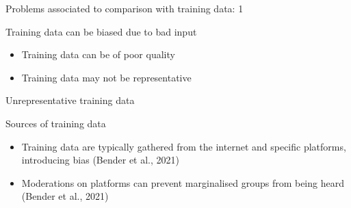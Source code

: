 \documentclass[compress]{beamer}
\begin{document}

\begin{frame}[fragile]{Problems associated to comparison with training data: 1} 	
	\begin{alertblock}{Training data can be biased due to bad input}
		\begin{itemize}
			\item Training data can be of poor quality
			\item Training data may not be representative
		\end{itemize}
	\end{alertblock}
\end{frame}

\begin{frame}[fragile]{Unrepresentative training data} 	
	\begin{alertblock}{Sources of training data}
		\begin{itemize}
			\item Training data are typically gathered from the internet and specific platforms, introducing bias (Bender et al., 2021)
			\item Moderations on platforms can prevent marginalised groups from being heard (Bender et al., 2021)
		\end{itemize}
	\end{alertblock}
\end{frame}

\end{document}
